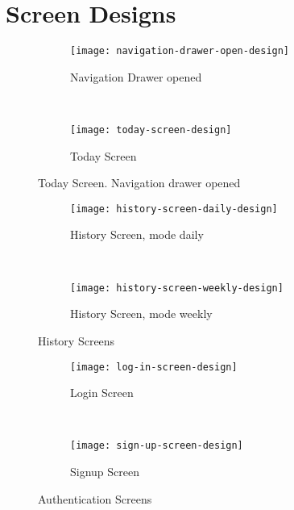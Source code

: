 \chapter{Screen Designs}
\label{chapter:screen-design}

\begin{figure*}[ht]
    \centering
    \begin{subfigure}[t]{0.4\textwidth}
        \centering
        \texttt{[image: navigation-drawer-open-design]}
        
        \caption{Navigation Drawer opened}
        \label{fig:nav-drawer-opened}
    \end{subfigure}%
    ~ 
    \begin{subfigure}[t]{0.4\textwidth}
        \centering
        \texttt{[image: today-screen-design]}
        \caption{Today Screen}
        \label{fig:today-screen}
    \end{subfigure}
    \caption{Today Screen. Navigation drawer opened}
\end{figure*}



\begin{figure*}[ht]
    \centering
    \begin{subfigure}[t]{0.4\textwidth}
        \centering
        \texttt{[image: history-screen-daily-design]}
        \caption{History Screen, mode daily}
    \end{subfigure}%
    ~ 
    \begin{subfigure}[t]{0.4\textwidth}
        \centering
        \texttt{[image: history-screen-weekly-design]}
        \caption{History Screen, mode weekly}
    \end{subfigure}
    \caption{History Screens}
\end{figure*}



\begin{figure*}[ht]
    \centering
    \begin{subfigure}[t]{0.4\textwidth}
        \centering
        \texttt{[image: log-in-screen-design]}
        \caption{Login Screen}
    \end{subfigure}%
    ~ 
    \begin{subfigure}[t]{0.4\textwidth}
        \centering
        \texttt{[image: sign-up-screen-design]}
        \caption{Signup Screen}
    \end{subfigure}
    \caption{Authentication Screens}
    \label{fig:authentication-screens}
\end{figure*}



